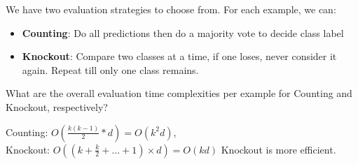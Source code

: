 \documentclass[11pt]{article}
\begin{document}
\begin{enumerate}
We have two evaluation strategies to choose from. For each example, we can:
\begin{itemize}
  \item \textbf{Counting}: Do all predictions then do a majority vote to decide class label
  \item \textbf{Knockout}: Compare two classes at a time, if one loses, never consider it
again. Repeat till only one class remains.
\end{itemize}
What are the overall evaluation time complexities per example for Counting and
Knockout, respectively?

Counting: $O(\frac{k(k-1)}{2}*d) = O(k^2 d)$, \\
Knockout: $O\left(\left(k+\frac{k}{2} + ... + 1\right) \times d\right) = O(kd)$
Knockout is more efficient.
\end{enumerate}
\end{document}
